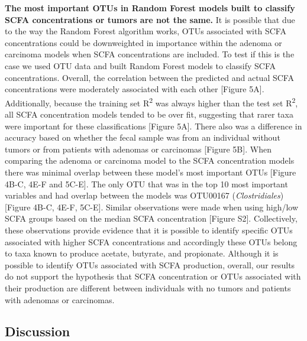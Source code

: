 \documentclass[11pt,]{article}
\begin{document}
\textbf{The most important OTUs in Random Forest models built to
classify SCFA concentrations or tumors are not the same.} It is possible
that due to the way the Random Forest algorithm works, OTUs associated
with SCFA concentrations could be downweighted in importance within the
adenoma or carcinoma models when SCFA concentrations are included. To
test if this is the case we used OTU data and built Random Forest models
to classify SCFA concentrations. Overall, the correlation between the
predicted and actual SCFA concentrations were moderately associated with
each other {[}Figure 5A{]}. Additionally, because the training set
R\textsuperscript{2} was always higher than the test set
R\textsuperscript{2}, all SCFA concentration models tended to be over
fit, suggesting that rarer taxa were important for these classifications
{[}Figure 5A{]}. There also was a difference in accuracy based on
whether the fecal sample was from an individual without tumors or from
patients with adenomas or carcinomas {[}Figure 5B{]}. When comparing the
adenoma or carcinoma model to the SCFA concentration models there was
minimal overlap between these model's most important OTUs {[}Figure
4B-C, 4E-F and 5C-E{]}. The only OTU that was in the top 10 most
important variables and had overlap between the models was OTU00167
(\emph{Clostridiales}) {[}Figure 4B-C, 4E-F, 5C-E{]}. Similar
observations were made when using high/low SCFA groups based on the
median SCFA concentration {[}Figure S2{]}. Collectively, these
observations provide evidence that it is possible to identify specific
OTUs associated with higher SCFA concentrations and accordingly these
OTUs belong to taxa known to produce acetate, butyrate, and propionate.
Although it is possible to identify OTUs associated with SCFA
production, overall, our results do not support the hypothesis that SCFA
concentration or OTUs associated with their production are different
between individuals with no tumors and patients with adenomas or
carcinomas.

\newpage

\subsection{Discussion}\label{discussion}
\end{document}
